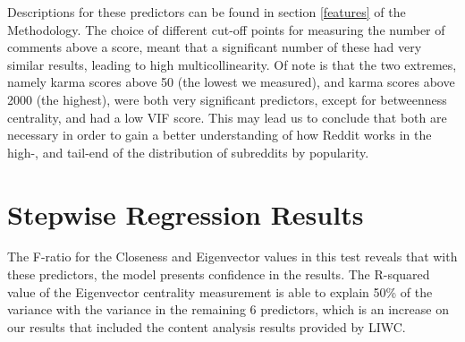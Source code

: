 \documentclass[bsc,frontabs,twoside,singlespacing,parskip,deptreport]{infthesis}
\begin{document}
Descriptions for these predictors can be found in section \ref{features} of the Methodology. The choice of different cut-off points for measuring the number of comments above a score, meant that a significant number of these had very similar results, leading to high multicollinearity. Of note is that the two extremes, namely karma scores above 50 (the lowest we measured), and karma scores above 2000 (the highest), were both very significant predictors, except for betweenness centrality, and had a low VIF score. This may lead us to conclude that both are necessary in order to gain a better understanding of how Reddit works in the high-, and tail-end of the distribution of subreddits by popularity.

\newpage

\section{Stepwise Regression Results}

The F-ratio for the Closeness and Eigenvector values in this test reveals that with these predictors, the model presents confidence in the results. The R-squared value of the Eigenvector centrality measurement is able to explain 50\% of the variance with the variance in the remaining 6 predictors, which is an increase on our results that included the content analysis results provided by LIWC.

\begin{table}[!h]
\centering
{}
\caption{Summary of stepwise regression results for RQ2}
\label{tab:stepwise-rq2}
\end{table}
\end{document}

